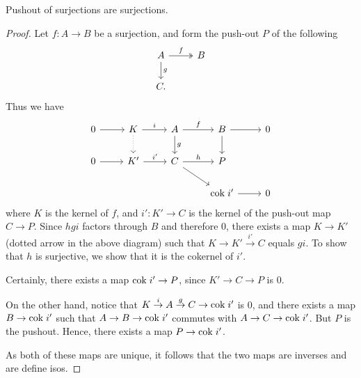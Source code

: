 \begin{prop}
Pushout of surjections are surjections.
\end{prop}

\begin{proof}
Let $f: A \to B$ be a surjection, and form the push-out $P$ of the 
following
\[
\begin{tikzcd}
A \arrow[twoheadrightarrow]{r}{f} \arrow{d}{g} &
B \\
C.
\end{tikzcd}
\]
Thus we have
\[
\begin{tikzcd}
0 \arrow{r} & 
K \arrow{r}{i}\arrow[dotted]{d} &
A \arrow{r}{f}\arrow{d}{g} &
B \arrow{r}\arrow{d}&
0 \\
0 \arrow{r} &
K' \arrow{r}{i'} &
C \arrow{r}{h} \arrow{rd}&
P \\
& & &\cok i' \arrow{r} &
0
\end{tikzcd}
\]
where $K$ is the kernel of $f$, and $i': K' \to C$ is the kernel 
of the push-out map $C \to P$. Since $hgi$ factors through $B$
and therefore $0$, there exists a map $K \to K'$ (dotted arrow
in the above diagram) such that $K \to K' \stackrel{i'}{\to} C$
equals $gi$. To show that $h$ is surjective, we show that it is 
the cokernel of $i'$.

Certainly, there exists a map $\mathrm{cok}\; i' \to P$, since $K' \to C 
\to P$ is 0. 

On the other hand, notice that $K \stackrel{i}{\to} A 
\stackrel{g}{\to} C \to \mathrm{cok}\; i'$ is 0, and there exists a map
$B \to \mathrm{cok}\; i'$ such that $A \to B \to \mathrm{cok}\; i'$ commutes with
$A \to C \to \mathrm{cok}\; i'$. But $P$ is the pushout. Hence, there
exists a map $P \to \mathrm{cok}\; i'$. 

As both of these maps are unique, it follows that the two maps
are inverses and are define isos.
\end{proof}
